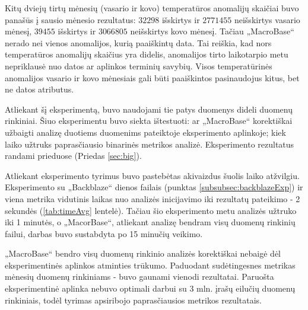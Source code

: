 \documentclass{VUMIFPSkursinis}
\begin{document}
Kitų dviejų tirtų mėnesių (vasario ir kovo) temperatūros anomalijų skaičiai buvo panašūs į sausio mėnesio rezultatus: $32 298$ išskirtys ir $2 771 455$ neišskirtys vasario mėnesį, $39 455$ išskirtys ir $3 066 805$ neišskirtys kovo mėnesį. Tačiau „MacroBase“ nerado nei vienos anomalijos, kurią paaiškintų data. Tai reiškia, kad nors temperatūros anomalijų skaičius yra didelis, anomalijos tirto laikotarpio metu nepriklausė nuo datos ar aplinkos terminių savybių. Visos temperatūrinės anomalijos vasario ir kovo mėnesiais gali būti paaiškintos pasinaudojus kitus, bet ne datos atributus.

 \label{subsubsubsec:dideli}
Atliekant šį eksperimentą, buvo naudojami tie patys duomenys dideli duomenų rinkiniai. Šiuo eksperimentu buvo siekta ištestuoti: ar „MacroBase“ korektiškai užbaigti analizę duotiems duomenims pateiktoje eksperimento aplinkoje; kiek laiko užtruks paprasčiausio binarinės metrikos analizė. Eksperimento rezultatus randami prieduose (Priedas \ref{sec:big}).\par

Atliekant eksperimento tyrimus buvo pastebėtas akivaizdus šuolis laiko atžvilgiu. Eksperimento su „Backblaze“ dienos failais (punktas \ref{subsubsec:backblazeExp}) ir viena metrika vidutinis laikas nuo analizės inicijavimo iki rezultatų pateikimo - 2 sekundės (\ref{tab:timeAvg} lentelė). Tačiau šio eksperimento metu analizės užtruko iki 1 minutės, o „MacorBase“, atliekant analizę bendram visų duomenų rinkinių failui, darbas buvo sustabdyta po 15 minučių veikimo. \par
„MacroBase“ bendro visų duomenų rinkinio analizės korektiškai nebaigė dėl eksperimentinės aplinkos atminties trūkumo. Paduodant sudėtingesnes metrikas mėnesių duomenų rinkiniams - buvo gaunami vienodi rezultatai. Paruošta eksperimentinė aplinka nebuvo optimali darbui su 3 mln. įrašų eilučių duomenų rinkiniais, todėl tyrimas apsiribojo paprasčiausios metrikos rezultatais.
\end{document}
